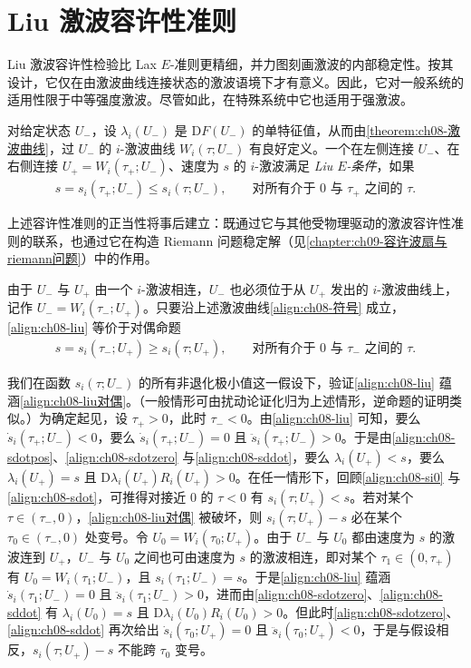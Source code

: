 \documentclass[../../main.tex]{subfiles}
\begin{document}
\section{Liu 激波容许性准则}\label{section:ch08-liu容许性准则}

Liu 激波容许性检验比 Lax $E$-准则更精细，并力图刻画激波的内部稳定性。按其设计，它仅在由激波曲线连接状态的激波语境下才有意义。因此，它对一般系统的适用性限于中等强度激波。尽管如此，在特殊系统中它也适用于强激波。

对给定状态 $U_-$，设 $\lambda_i(U_-)$ 是 $\mathrm{D}F(U_-)$ 的单特征值，从而由\cref{theorem:ch08-激波曲线}，过 $U_-$ 的 $i$-激波曲线 $W_i(\tau;U_-)$ 有良好定义。一个在左侧连接 $U_-$、在右侧连接 $U_+=W_i(\tau_+;U_-)$、速度为 $s$ 的 $i$-激波满足 \emph{Liu $E$-条件}，如果
\begin{align}
s=s_i(\tau_+;U_-)\leqslant s_i(\tau;U_-),\qquad\text{对所有介于 }0\text{ 与 }\tau_+\text{ 之间的 }\tau.
\label{align:ch08-liu}
\end{align}

上述容许性准则的正当性将事后建立：既通过它与其他受物理驱动的激波容许性准则的联系，也通过它在构造 Riemann 问题稳定解（见\cref{chapter:ch09-容许波扇与riemann问题}）中的作用。

由于 $U_-$ 与 $U_+$ 由一个 $i$-激波相连，$U_-$ 也必须位于从 $U_+$ 发出的 $i$-激波曲线上，记作 $U_-=W_i(\tau_-;U_+)$。只要沿上述激波曲线\eqref{align:ch08-符号} 成立，\eqref{align:ch08-liu} 等价于对偶命题
\begin{align}
s=s_i(\tau_-;U_+)\geqslant s_i(\tau;U_+),\qquad\text{对所有介于 }0\text{ 与 }\tau_-\text{ 之间的 }\tau.
\label{align:ch08-liu对偶}
\end{align}

我们在函数 $s_i(\tau;U_-)$ 的所有非退化极小值这一假设下，验证\eqref{align:ch08-liu} 蕴涵\eqref{align:ch08-liu对偶}。（一般情形可由扰动论证化归为上述情形，逆命题的证明类似。）为确定起见，设 $\tau_+>0$，此时 $\tau_-<0$。由\eqref{align:ch08-liu} 可知，要么 $\dot s_i(\tau_+;U_-)<0$，要么 $\dot s_i(\tau_+;U_-)=0$ 且 $\ddot s_i(\tau_+;U_-)>0$。于是由\eqref{align:ch08-sdotpos}、\eqref{align:ch08-sdotzero} 与\eqref{align:ch08-sddot}，要么 $\lambda_i(U_+)<s$，要么 $\lambda_i(U_+)=s$ 且 $\mathrm{D}\lambda_i(U_+)R_i(U_+)>0$。在任一情形下，回顾\eqref{align:ch08-si0} 与\eqref{align:ch08-sdot}，可推得对接近 $0$ 的 $\tau<0$ 有 $s_i(\tau;U_+)<s$。若对某个 $\tau\in(\tau_-,0)$，\eqref{align:ch08-liu对偶} 被破坏，则 $s_i(\tau;U_+)-s$ 必在某个 $\tau_0\in(\tau_-,0)$ 处变号。令 $U_0=W_i(\tau_0;U_+)$。由于 $U_-$ 与 $U_0$ 都由速度为 $s$ 的激波连到 $U_+$，$U_-$ 与 $U_0$ 之间也可由速度为 $s$ 的激波相连，即对某个 $\tau_1\in(0,\tau_+)$ 有 $U_0=W_i(\tau_1;U_-)$，且 $s_i(\tau_1;U_-)=s$。于是\eqref{align:ch08-liu} 蕴涵 $\dot s_i(\tau_1;U_-)=0$ 且 $\ddot s_i(\tau_1;U_-)>0$，进而由\eqref{align:ch08-sdotzero}、\eqref{align:ch08-sddot} 有 $\lambda_i(U_0)=s$ 且 $\mathrm{D}\lambda_i(U_0)R_i(U_0)>0$。但此时\eqref{align:ch08-sdotzero}、\eqref{align:ch08-sddot} 再次给出 $\dot s_i(\tau_0;U_+)=0$ 且 $\ddot s_i(\tau_0;U_+)<0$，于是与假设相反，$s_i(\tau;U_+)-s$ 不能跨 $\tau_0$ 变号。
\end{document}
